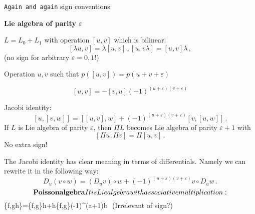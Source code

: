  

\baselineskip=14pt
\def\vare {\varepsilon}
\def\t {\tilde}
\def\a {\alpha}
\def\K {{\bf K}}
\def\N {{\bf N}}
\def\C {{\cal C}}
\def\L {{\cal L}}
\def\E {{\cal E}}
\def\s {{\sigma}}
\def\S {{\Sigma}}
\def\p{\partial}
\def\vare{{\varepsilon}}
\def\Q {{\bf Q}}
\def\D {{\cal D}}
\def\G {{\Gamma}}
\def\Z {{\bf Z}}
\def\R  {{\bf R}}
\def\l {\lambda}
\def\ll {{\bf l}}
\def\degree {{\bf {\rm degree}\,\,}}
\def \finish {${\,\,\vrule height1mm depth2mm width 8pt}$}
\def \m {\medskip}
\def\p {\partial}
\def\r {{\bf r}}
\def\pt {{\bf p}}
\def\v {{\bf v}}
\def\n {{\bf n}}
\def\t {{\bf t}}
\def\b {{\bf b}}
\def\c {{\bf c }}
\def\e{{\bf e}}
\def\f{{\bf f}}
\def\ac {{\bf a}}
\def \X   {{\bf X}}
\def \Y   {{\bf Y}}
\def \x   {{\bf x}}
\def \y   {{\bf y}}
\def\w {{\omega}}
\def \Tr  {{\rm Tr\,}}
\def\dim {{\rm dim\,\,}}
\def\t {{\tilde}} 
\def\dist {{\hbox{\tt "distance"}}}
\def  \dim {{\rm dim\,}}
\def  \Im  {{\rm Im\,}}
\def  \ker {{\rm ker\,}}

\centerline {{\tt Again and again} sign conventions}


      {\bf Lie algebra of parity $\vare$}

    $L=L_0+L_1$ with operation $[u,v]$
which is bilinear:
            $$
     [\lambda u,v]=\lambda [u,v]\,,
     [ u,v\lambda]=[u,v]\lambda\,,
            $$
(no sign for arbitrary $\vare=0,1$!)



  Operation ${u,v}$ such that $p([u,v])=p(u+v+\vare)$

      $$
 [u,v]=-[v,u](-1)^{(u+\vare)(v+\vare)}
      $$

Jacobi identity:
         $$
[u,[v,w]]=[[u,v],w]+(-1)^{(u+\vare)(v+\vare)}[v,[u,w]]\,.
        $$
If $L$ is Lie algebra of parity $\vare$,
 then $\Pi L$ becomes Lie algebra of parity $\vare+1$
with
         $$
   \left[\Pi u,\Pi v\right]=
   \Pi \left[ u, v\right]\,.
         $$
No extra sign!

The Jacobi identity has clear meaning in terms of
differentials. Namely we can rewrite it in the following
way:
   $$
    D_u(v\circ w)=\left(D_u v\right)\circ w+
   (-1)^{(u+\vare)(v+\vare)}v\circ D_u w\,.
    $$
   $$
 


\bigskip

   {\bf Poisson algebra}

It is Lie algebra with associative multiplication:
               $$
   \{f,gh\}=\{f,g\}h+h\{f,g\}(-1)^{(a+1)b}
               $$
(Irrelevant of sign?)
\bye

